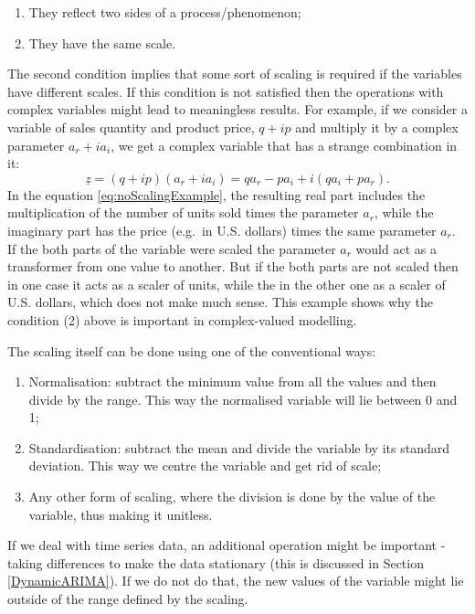 \documentclass[
]{book}
\providecommand{\tightlist}{%
  \setlength{\itemsep}{0pt}\setlength{\parskip}{0pt}}
\begin{document}
\begin{enumerate}
\def\labelenumi{\arabic{enumi}.}
\tightlist
\item
  They reflect two sides of a process/phenomenon;
\item
  They have the same scale.
\end{enumerate}

The second condition implies that some sort of scaling is required if the variables have different scales. If this condition is not satisfied then the operations with complex variables might lead to meaningless results. For example, if we consider a variable of sales quantity and product price, \(q + ip\) and multiply it by a complex parameter \(a_r + i a_i\), we get a complex variable that has a strange combination in it:
\begin{equation}
    \underline{z} = (q + ip) (a_r + i a_i) = q a_r - p a_i + i(q a_i + p a_r).
    \label{eq:noScalingExample}
\end{equation}
In the equation \eqref{eq:noScalingExample}, the resulting real part includes the multiplication of the number of units sold times the parameter \(a_r\), while the imaginary part has the price (e.g.~in U.S. dollars) times the same parameter \(a_r\). If the both parts of the variable were scaled the parameter \(a_r\) would act as a transformer from one value to another. But if the both parts are not scaled then in one case it acts as a scaler of units, while the in the other one as a scaler of U.S. dollars, which does not make much sense. This example shows why the condition (2) above is important in complex-valued modelling.

The scaling itself can be done using one of the conventional ways:

\begin{enumerate}
\def\labelenumi{\alph{enumi}.}
\tightlist
\item
  Normalisation: subtract the minimum value from all the values and then divide by the range. This way the normalised variable will lie between 0 and 1;
\item
  Standardisation: subtract the mean and divide the variable by its standard deviation. This way we centre the variable and get rid of scale;
\item
  Any other form of scaling, where the division is done by the value of the variable, thus making it unitless.
\end{enumerate}

If we deal with time series data, an additional operation might be important - taking differences to make the data stationary (this is discussed in Section \ref{DynamicARIMA}). If we do not do that, the new values of the variable might lie outside of the range defined by the scaling.
\end{document}
